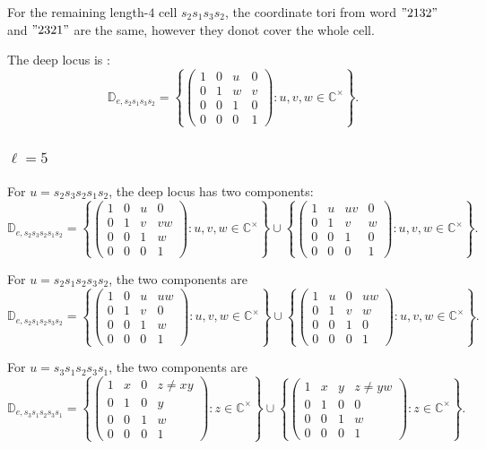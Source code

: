 \documentclass[12pt]{amsart}
\newcommand{\C}{\mathbb C}
\newcommand{\D}{\mathbb D}
\theoremstyle{plain}
\theoremstyle{definition}
\theoremstyle{remark}
\begin{document}
For the remaining length-$4$ cell $s_2s_1s_3s_2$, the coordinate tori from word $"2132"$ and $"2321"$ are the same, however they donot cover the whole cell. 

The deep locus is :
\[
\D_{e,s_2s_1s_3s_2}=
\left\{
\begin{pmatrix}
1&0&u&0\\
0&1&w&v\\
0&0&1&0\\
0&0&0&1
\end{pmatrix}
:u,v,w\in\C^{\times}
\right\}.
\]


\subsubsection*{$\ell=5$}

For $u=s_2s_3s_2s_1s_2$, the deep locus has two components:
\[
\D_{e,s_2s_3s_2s_1s_2}=
\left\{
\begin{pmatrix}
1&0&u&0\\
0&1&v&vw\\
0&0&1&w\\
0&0&0&1
\end{pmatrix}
:u,v,w\in\C^{\times}
\right\}
\cup
\left\{
\begin{pmatrix}
1&u&uv&0\\
0&1&v&w\\
0&0&1&0\\
0&0&0&1
\end{pmatrix}
:u,v,w\in\C^{\times}
\right\}.
\]

For $u=s_2s_1s_2s_3s_2$, the two components are
\[
\D_{e,s_2s_1s_2s_3s_2}=
\left\{
\begin{pmatrix}
1&0&u&uw\\
0&1&v&0\\
0&0&1&w\\
0&0&0&1
\end{pmatrix}
:u,v,w\in\C^{\times}
\right\}
\cup
\left\{
\begin{pmatrix}
1&u&0&uw\\
0&1&v&w\\
0&0&1&0\\
0&0&0&1
\end{pmatrix}
:u,v,w\in\C^{\times}
\right\}.
\]

For $u=s_3s_1s_2s_3s_1$, the two components are
\[
\D_{e,s_3s_1s_2s_3s_1}=
\left\{
\begin{pmatrix}
1&x&0&z\neq xy\\
0&1&0&y\\
0&0&1&w\\
0&0&0&1
\end{pmatrix}
:z\in\C^{\times}
\right\}
\cup
\left\{
\begin{pmatrix}
1&x&y&z\neq yw\\
0&1&0&0\\
0&0&1&w\\
0&0&0&1
\end{pmatrix}
:z\in\C^{\times}
\right\}.
\]
\end{document}
